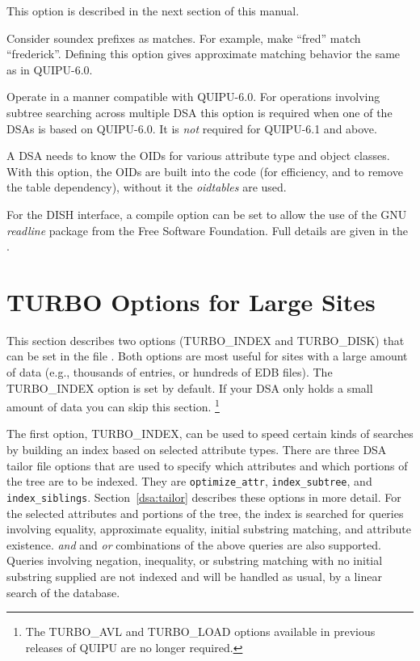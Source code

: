 \begin{describe}
\item [\verb+\#define TURBO\_INDEX+:]
This option is described in the next section of this manual.

\item [\verb+\#define SOUNDEX\_PREFIX+:]
Consider soundex prefixes as matches.  For example, make
``fred'' match ``frederick''.  Defining this option gives
approximate matching behavior the same as in QUIPU-6.0.

\item [\verb+\#define COMPAT\_6\_0+:]
Operate in a manner compatible with QUIPU-6.0.  
For operations involving subtree searching across
multiple DSA this option is required when one of the DSAs is based on
QUIPU-6.0.  It is {\em not} required for QUIPU-6.1 and above.

\item [\verb+\#define USE\_BUILTIN\_OIDS+:] 
A DSA needs to know the OIDs
for various attribute type and object classes.  With this option, the
OIDs are built into the code (for efficiency, and to remove the table 
dependency), without it the {\em oidtables} are used.
\end{describe}

For the DISH interface, a compile option can be set to allow the use
of the GNU {\em readline} package from the 
Free Software
Foundation.
Full details are given in the .


\section{TURBO Options for Large Sites}
This section describes two options (TURBO\_INDEX 
and TURBO\_DISK) that
can be set in the file .  Both options are
most useful for sites with a large amount of data (e.g., thousands of
entries, or hundreds of EDB files).
The TURBO\_INDEX option is set by default.
If your DSA only holds a small amount of data you can skip this 
section.
\footnote{The TURBO\_AVL and TURBO\_LOAD options available in previous
releases of QUIPU are no longer required.}

The first option, TURBO\_INDEX, can be used to speed certain
kinds of searches by building an index based on selected
attribute types.  There are three DSA tailor file options
that are used to specify which attributes and
which portions of the tree are to be indexed.  They are
\verb"optimize_attr", \verb+index_subtree+, and \verb"index_siblings".
Section~\ref{dsa:tailor} describes these options in more
detail.  For the selected attributes and portions of the tree,
the index is searched for queries involving equality, approximate
equality, initial substring matching, and attribute existence.
{\em and} and {\em or} combinations of the above queries are also supported.
Queries involving negation, inequality, or substring matching
with no initial substring supplied are not indexed and will be
handled as usual, by a linear search of the database.

